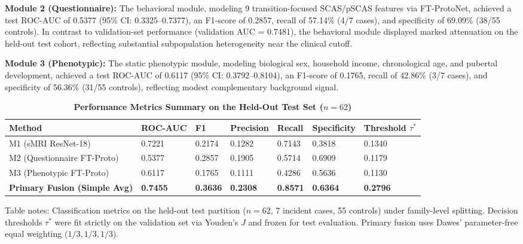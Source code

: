 \documentclass[10pt,letterpaper]{article}
\begin{document}
\textbf{Module 2 (Questionnaire):} The behavioral module, modeling 9 transition-focused SCAS/pSCAS features via FT-ProtoNet, achieved a test ROC-AUC of 0.5377 (95\% CI: 0.3325--0.7377), an F1-score of 0.2857, recall of 57.14\% (4/7 cases), and specificity of 69.09\% (38/55 controls). In contrast to validation-set performance (validation AUC = 0.7481), the behavioral module displayed marked attenuation on the held-out test cohort, reflecting substantial subpopulation heterogeneity near the clinical cutoff.

\textbf{Module 3 (Phenotypic):} The static phenotypic module, modeling biological sex, household income, chronological age, and pubertal development, achieved a test ROC-AUC of 0.6117 (95\% CI: 0.3792--0.8104), an F1-score of 0.1765, recall of 42.86\% (3/7 cases), and specificity of 56.36\% (31/55 controls), reflecting modest complementary background signal.

\begin{table}[!t]
\begin{adjustwidth}{-2.25in}{0in}
\centering
\caption{\textbf{Performance Metrics Summary on the Held-Out Test Set ($n=62$)}}
\label{tab:performance_summary}
\footnotesize
\renewcommand{\arraystretch}{1.15}
\begin{tabular}{|p{3.2cm}|p{1.8cm}|p{1.6cm}|p{1.8cm}|p{1.8cm}|p{1.8cm}|p{1.8cm}|}
\hline
\textbf{Method} & \textbf{ROC-AUC} & \textbf{F1} & \textbf{Precision} & \textbf{Recall} & \textbf{Specificity} & \textbf{Threshold $\tau^*$} \\
\hline
M1 (sMRI ResNet-18) & 0.7221 & 0.2174 & 0.1282 & 0.7143 & 0.3818 & 0.1340 \\
\hline
M2 (Questionnaire FT-Proto) & 0.5377 & 0.2857 & 0.1905 & 0.5714 & 0.6909 & 0.1179 \\
\hline
M3 (Phenotypic FT-Proto) & 0.6117 & 0.1765 & 0.1111 & 0.4286 & 0.5636 & 0.1130 \\
\hline
\textbf{Primary Fusion (Simple Avg)} & \textbf{0.7455} & \textbf{0.3636} & \textbf{0.2308} & \textbf{0.8571} & \textbf{0.6364} & \textbf{0.2796} \\
\hline
\end{tabular}
\begin{flushleft}
Table notes: Classification metrics on the held-out test partition ($n=62$, 7 incident cases, 55 controls) under family-level splitting. Decision thresholds $\tau^*$ were fit strictly on the validation set via Youden's $J$ and frozen for test evaluation. Primary fusion uses Dawes' parameter-free equal weighting ($1/3, 1/3, 1/3$).
\end{flushleft}
\end{adjustwidth}
\end{table}
\end{document}
